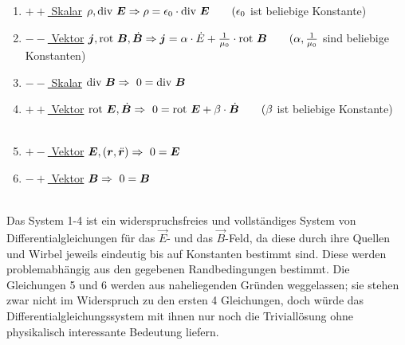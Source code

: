 \begin{enumerate}
	\item
	\underline{$++$ Skalar} \quad $\rho,\div \vec{E}\\
	\\
	\Rightarrow \rho = \epsilon_0 \cdot \div\vec{E} \qquad (\epsilon_0$  ist beliebige Konstante)
	
	\item
	\underline{$--$ Vektor} \quad $\vec{j}, \rot \vec{B},\dot{\vec{B}}\\
	\\
	\Rightarrow \vec{j} = \alpha\cdot\dot{E} + \frac{1}{\mu_0}\cdot\rot \vec{B}  \qquad (\alpha,\frac{1}{\mu_0}$ sind beliebige Konstanten)
	
	\item
	\underline{$--$ Skalar} \quad $\div \vec{B}\\ 
	\\
	\Rightarrow \ 0 = \div \vec{B}$
	
	\item
	\underline{$++$ Vektor} \quad $\rot\vec{E},\dot{\vec{B}}\\
	\\
	\Rightarrow \ 0 = \rot \vec{E} + \beta\cdot\dot{\vec{B}} \qquad (\beta$  ist beliebige Konstante)
	\\
	\\
	
	\item
	\underline{$+-$ Vektor}  \quad $\vec{E},(\vec{r},\ddot{\vec{r}})\\
	\\
	\Rightarrow \ 0 =  \vec{E}$
	
	\item
	\underline{$-+$ Vektor} \quad $\vec{B}\\
	\\
	\Rightarrow \ 0 = \vec{B}$
\end{enumerate}
\ \\

Das System 1-4 ist ein widerspruchsfreies und vollständiges System von Differentialgleichungen für das $\vec{E}$- und das $\vec{B}$-Feld, da diese durch ihre Quellen und Wirbel jeweils eindeutig bis auf Konstanten bestimmt sind. Diese werden problemabhängig aus den gegebenen Randbedingungen bestimmt. Die Gleichungen 5 und 6 werden aus naheliegenden Gründen weggelassen; sie stehen zwar nicht im Widerspruch zu den ersten 4 Gleichungen, doch würde das Differentialgleichungssystem mit ihnen nur noch die Triviallösung ohne physikalisch interessante Bedeutung liefern.\
\\
\ \\
\ \\

